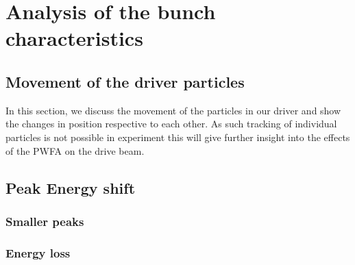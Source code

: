 \documentclass[bachelor_thesis]{subfiles}
\begin{document}
\chapter{Analysis of the bunch characteristics}
\section{Movement of the driver particles}
In this section, we discuss the movement of the particles in our driver and show the changes in position respective to each other. As such tracking of individual particles is not possible in experiment
this will give further insight into the effects of the \gls{PWFA} on the drive beam.


\section{Peak Energy shift}


\subsection{Smaller peaks}
\subsection{Energy loss}
\end{document}
